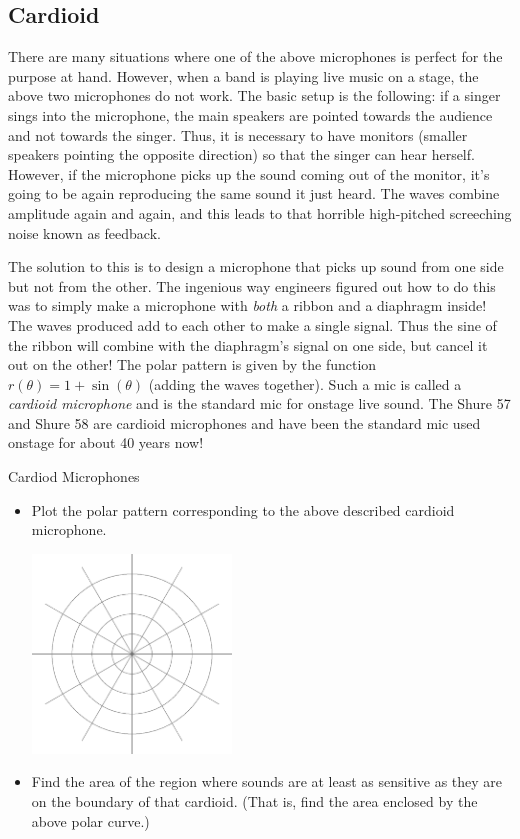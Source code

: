 \subsection{Cardioid} 
There are many situations where one of the above microphones is perfect for the purpose at hand.  However, when a band is playing live music on a stage, the above two microphones do not work.  The basic setup is the following: if a singer sings into the microphone, the main speakers are pointed towards the audience and not towards the singer.  Thus, it is necessary to have monitors (smaller speakers pointing the opposite direction) so that the singer can hear herself.  However, if the microphone picks up the sound coming out of the monitor, it's going to be again reproducing the same sound it just heard.  The waves combine amplitude again and again, and this leads to that horrible high-pitched screeching noise known as feedback.  

The solution to this is to design a microphone that picks up sound from one side but not from the other.  The ingenious way engineers figured out how to do this was to simply make a microphone with \emph{both} a ribbon and a diaphragm inside!  The waves produced add to each other to make a single signal.  Thus the sine of the ribbon will combine with the diaphragm's signal on one side, but cancel it out on the other!  The polar pattern is given by the function $r(\theta)=1+\sin(\theta)$ (adding the waves together).  Such a mic is called a \emph{cardioid microphone} and is the standard mic for onstage live sound.  The Shure 57 and Shure 58 are cardioid microphones and have been the standard mic used onstage for about 40 years now!

\begin{exercise}{Cardiod Microphones \Coffeecup \Coffeecup}

\begin{itemize}
\item Plot the polar pattern corresponding to the above described cardioid microphone.
	\begin{center}
		\includegraphics[width=150pt]{polar.eps}
	\end{center}
\item Find the area of the region where sounds are at least as sensitive as they are on the boundary of that cardioid.  (That is, find the area enclosed by the above polar curve.)
\vspace*{2in}
\end{itemize}
\end{exercise}

